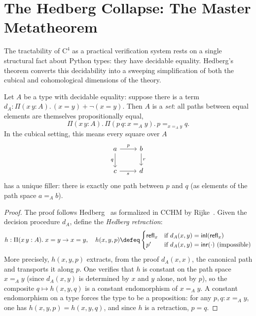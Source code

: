 \section{The Hedberg Collapse: The Master Metatheorem}
\label{sec:hedberg}

The tractability of $\mathrm{C}^4$ as a practical verification system
rests on a single structural fact about Python types: they have decidable
equality.  Hedberg's theorem converts this decidability into a sweeping
simplification of both the cubical and cohomological dimensions of the theory.

\begin{theorem}
\label{thm:hedberg}
Let $A$ be a type with decidable equality: suppose there is a term
$d_A : \Pi(x\, y : A).\, (x = y) + \neg(x = y)$.
Then $A$ is a \emph{set}: all paths between equal elements are themselves
propositionally equal,
\[
  \Pi(x\, y : A).\, \Pi(p\, q : x =_A y).\, p =_{x =_A y} q.
\]
In the cubical setting, this means every square over $A$
\[
  \begin{tikzcd}
    a \ar[r,"p"] \ar[d,"q"'] & b \ar[d,"r"] \\
    c \ar[r,"s"'] & d
  \end{tikzcd}
\]
has a unique filler: there is exactly one path between $p$ and $q$
(as elements of the path space $a =_A b$).
\end{theorem}

\begin{proof}
The proof follows Hedberg~\cite{hedberg1998} as formalized in CCHM by
Rijke~\cite{rijke2022}.  Given the decision procedure $d_A$, define the
\emph{Hedberg retraction}:
\[
  h : \Pi(x\, y : A).\; x = y \to x = y,\quad
  h(x,y,p) \defeq \begin{cases}
    \mathsf{refl}_x & \text{if } d_A(x,y) = \mathsf{inl}(\mathsf{refl}_x) \\
    p' & \text{if } d_A(x,y) = \mathsf{inr}(\cdot) \text{ (impossible)}
  \end{cases}
\]
More precisely, $h(x,y,p)$ extracts, from the proof $d_A(x,x)$,
the canonical path and transports it along $p$.  One verifies that
$h$ is constant on the path space $x =_A y$ (since $d_A(x,y)$ is
determined by $x$ and $y$ alone, not by $p$), so the composite
$q \mapsto h(x,y,q)$ is a constant endomorphism of $x =_A y$.
A constant endomorphism on a type forces the type to be a proposition:
for any $p, q : x =_A y$, one has $h(x,y,p) = h(x,y,q)$, and since
$h$ is a retraction, $p = q$.
\end{proof}

